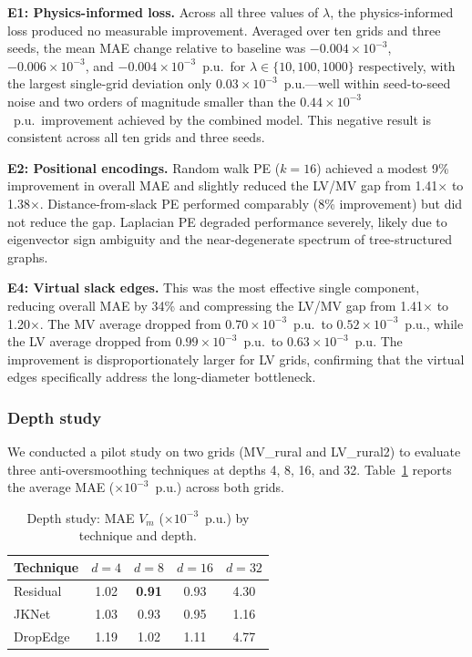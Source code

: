\documentclass[preprint,review,12pt]{elsarticle}
\begin{document}
\textbf{E1: Physics-informed loss.} Across all three values of $\lambda$, the physics-informed loss produced no measurable improvement. Averaged over ten grids and three seeds, the mean MAE change relative to baseline was $-0.004 \times 10^{-3}$, $-0.006 \times 10^{-3}$, and $-0.004 \times 10^{-3}$~p.u.\ for $\lambda \in \{10, 100, 1000\}$ respectively, with the largest single-grid deviation only $0.03 \times 10^{-3}$~p.u.---well within seed-to-seed noise and two orders of magnitude smaller than the $0.44 \times 10^{-3}$~p.u.\ improvement achieved by the combined model. This negative result is consistent across all ten grids and three seeds.

\textbf{E2: Positional encodings.} Random walk PE ($k=16$) achieved a modest 9\% improvement in overall MAE and slightly reduced the LV/MV gap from 1.41$\times$ to 1.38$\times$. Distance-from-slack PE performed comparably (8\% improvement) but did not reduce the gap. Laplacian PE degraded performance severely, likely due to eigenvector sign ambiguity and the near-degenerate spectrum of tree-structured graphs.

\textbf{E4: Virtual slack edges.} This was the most effective single component, reducing overall MAE by 34\% and compressing the LV/MV gap from 1.41$\times$ to 1.20$\times$. The MV average dropped from $0.70 \times 10^{-3}$~p.u.\ to $0.52 \times 10^{-3}$~p.u., while the LV average dropped from $0.99 \times 10^{-3}$~p.u.\ to $0.63 \times 10^{-3}$~p.u. The improvement is disproportionately larger for LV grids, confirming that the virtual edges specifically address the long-diameter bottleneck.

\subsubsection{Depth study}
\label{sec:depth}

We conducted a pilot study on two grids (MV\_rural and LV\_rural2) to evaluate three anti-oversmoothing techniques at depths 4, 8, 16, and 32. Table~\ref{tab:depth} reports the average MAE ($\times 10^{-3}$~p.u.) across both grids.

\begin{table}[!t]
\renewcommand{\arraystretch}{1.1}
\caption{Depth study: MAE $V_m$ ($\times 10^{-3}$~p.u.) by technique and depth.}
\label{tab:depth}
\centering
\begin{tabular}{lcccc}
\toprule
Technique & $d{=}4$ & $d{=}8$ & $d{=}16$ & $d{=}32$ \\
\midrule
Residual & 1.02 & \textbf{0.91} & 0.93 & 4.30 \\
JKNet & 1.03 & 0.93 & 0.95 & 1.16 \\
DropEdge & 1.19 & 1.02 & 1.11 & 4.77 \\
\bottomrule
\end{tabular}
\end{table}
\end{document}
